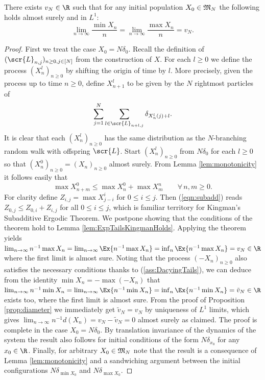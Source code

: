 \begin{proposition}\label{prop:ExpTailsSpeedExistence}
There exists $v_N \in \R$ such that for any initial population $X_0 \in \frak{M}_N$ the following holds almost surely and in $L^1$:
\begin{equation}
\lim\limits_{n \to \infty} \frac{\min X_n}{n} = \lim\limits_{n \to \infty} \frac{\max X_n}{n} = v_N. 
\end{equation}
\end{proposition}

\begin{proof}
First we treat the case $X_0 = N \delta_0$. Recall the definition of $(\scr{L}_{n, j})_{n \geq 0, j \in [N]}$ from the construction of $X$. For each $l \geq 0$ we define the process $(X^l_n)_{n \geq 0}$ by shifting the origin of time by $l$. More precisely, given the process up to time $n \geq 0$, define $X^l_{n+1}$ to be given by the $N$ rightmost particles of 
\begin{equation}
\sum_{j = 1}^N \sum_{l \in \scr{L}_{n + l, j}} \delta_{X^l_n(j) + l}. 
\end{equation}
It is clear that each $(X^l_n)_{n \geq 0}$ has the same distribution as the $N$-branching random walk with offspring $\scr{L}$. Start $(X^l_n)_{n \geq 0}$ from $N \delta_0$ for each $l \geq 0$ so that $(X^0_n)_{n \geq 0} = (X_n)_{n \geq 0}$ almost surely. From Lemma \ref{lem:monotonicity} it follows easily that 
\begin{equation}\label{eqn:subadd}
\max X^0_{n + m} \leq \max X^0_n + \max X^n_m \qquad \forall\, n,m \geq 0. 
\end{equation}
For clarity define $Z_{i,j} = \max X^i_{j - i}$ for $0 \leq i \leq j$. Then (\ref{eqn:subadd}) reads $Z_{0, j} \leq Z_{0,i} + Z_{i,j}$ for all $0 \leq i \leq j$, which is familiar territory for Kingman's Subadditive Ergodic Theorem. We postpone showing that the conditions of the theorem hold to Lemma \ref{lem:ExpTailsKingmanHolds}. Applying the theorem yields $\lim_{n \to \infty} n^{-1} \max X_n = \lim_{n \to \infty} \Ex{n^{-1} \max X_n} = \inf_n \Ex{n^{-1} \max X_n} = v_N \in \R$ where the first limit is almost sure. Noting that the process $(-X_n)_{n \geq 0}$ also satisfies the necessary conditions thanks to (\ref{ass:DacyingTails}), we can deduce from the identity $\min X_n = - \max (-X_n)$ that $\lim_{n \to \infty} n^{-1} \min X_n = \lim_{n \to \infty} \Ex{n^{-1} \min X_n} = \inf_n \Ex{n^{-1} \min X_n} = \tilde{v}_N \in \R$ exists too, where the first limit is almost sure. From the proof of Proposition \ref{prop:diameter} we immediately get $\tilde{v}_N = v_N$ by uniqueness of $L^1$ limits, which gives $\lim_{n\to\infty} n^{-1}d(X_n) = v_N - \tilde{v}_N = 0$ almost surely as claimed. The proof is complete in the case $X_0 = N \delta_0$. By translation invariance of the dynamics of the system the result also follows for initial conditions of the form $N \delta_{x_0}$ for any $x_0 \in \R$. Finally, for arbitrary $X_0 \in \frak{M}_N$ note that the result is a consequence of Lemma \ref{lem:monotonicity} and a sandwiching argument between the initial configurations $N \delta_{\min X_0}$ and $N \delta_{\max X_0}$. 
\end{proof}

